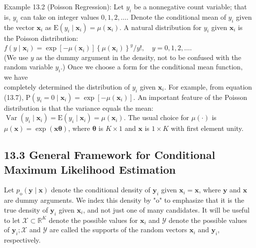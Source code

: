 \documentclass[10pt]{article}
\begin{document}
Example 13.2 (Poisson Regression): Let $y_{i}$ be a nonnegative count variable; that is, $y_{i}$ can take on integer values $0,1,2, \ldots$. Denote the conditional mean of $y_{i}$ given the vector $\mathbf{x}_{i}$ as $\mathrm{E}\left(y_{i} \mid \mathbf{x}_{i}\right)=\mu\left(\mathbf{x}_{i}\right)$. A natural distribution for $y_{i}$ given $\mathbf{x}_{i}$ is the Poisson distribution:\\
$f\left(y \mid \mathbf{x}_{i}\right)=\exp \left[-\mu\left(\mathbf{x}_{i}\right)\right]\left\{\mu\left(\mathbf{x}_{i}\right)\right\}^{y} / y!, \quad y=0,1,2, \ldots$.\\
(We use $y$ as the dummy argument in the density, not to be confused with the random variable $y_{i}$.) Once we choose a form for the conditional mean function, we have\\
completely determined the distribution of $y_{i}$ given $\mathbf{x}_{i}$. For example, from equation (13.7), $\mathrm{P}\left(y_{i}=0 \mid \mathbf{x}_{i}\right)=\exp \left[-\mu\left(\mathbf{x}_{i}\right)\right]$. An important feature of the Poisson distribution is that the variance equals the mean: $\operatorname{Var}\left(y_{i} \mid \mathbf{x}_{i}\right)=\mathrm{E}\left(y_{i} \mid \mathbf{x}_{i}\right)=\mu\left(\mathbf{x}_{i}\right)$. The usual choice for $\mu(\cdot)$ is $\mu(\mathbf{x})=\exp (\mathbf{x} \boldsymbol{\theta})$, where $\boldsymbol{\theta}$ is $K \times 1$ and $\mathbf{x}$ is $1 \times K$ with first element unity.

\subsection*{13.3 General Framework for Conditional Maximum Likelihood Estimation}
Let $p_{\mathrm{o}}(\mathbf{y} \mid \mathbf{x})$ denote the conditional density of $\mathbf{y}_{i}$ given $\mathbf{x}_{i}=\mathbf{x}$, where $\mathbf{y}$ and $\mathbf{x}$ are dummy arguments. We index this density by "o" to emphasize that it is the true density of $\mathbf{y}_{i}$ given $\mathbf{x}_{i}$, and not just one of many candidates. It will be useful to let $\mathscr{X} \subset \mathbb{R}^{K}$ denote the possible values for $\mathbf{x}_{i}$ and $\mathscr{Y}$ denote the possible values of $\mathbf{y}_{i} ; \mathscr{X}$ and $\mathscr{Y}$ are called the supports of the random vectors $\mathbf{x}_{i}$ and $\mathbf{y}_{i}$, respectively.
\end{document}

